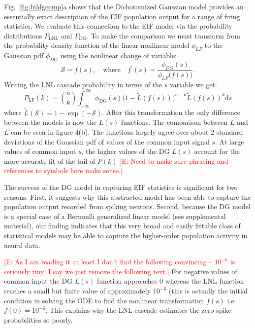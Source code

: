 \documentclass[%
 reprint,
 amsmath,amssymb,
 aps,
floatfix,
]{revtex4-1}
\newcommand{\dd}{\mathrm{d}}
\newcommand{\Ecomment}[1]{\textcolor{red}{[E: #1]}}
\begin{document}
Fig.~\ref{fig:lnldgcomp}a shows that the Dichotomized Gaussian model provides an essentially exact description of the EIF population output for a range of firing statistics.
We evaluate this connection to the EIF model via the probability distributions $P_{\text{LNL}}$ and $P_{\text{DG}}$. To make the comparison we must transform from the probability density function of the linear-nonlinear model $\phi_{LF}$ to the Gaussian pdf $\phi_{DG}$ using the nonlinear change of variable:
\begin{equation}
\mathcal{S} = f(s),\quad\text{where}\quad f^\prime(s) = \frac{\phi_{DG}(s)}{\phi_{LF}\big(f(s)\big)}.
\end{equation}
Writing the LNL cascade probability in terms of the $s$ variable we get:
\begin{equation}
P_{\text{LF}}(k) = \binom{n}{k}\!\!\int_{-\infty}^{~\infty} \phi_{\text{DG}}(s) \big(1-\tilde{L}(f(s))\big)^{n-k} \tilde{L}(f(s))^{k} \dd s
\end{equation}
where $\tilde{L}(\mathcal{S}) = 1-\exp(-\mathcal{S})$. After this transformation the only difference between the models is now the $L(s)$ functions. The comparison between $L$ and $\tilde{L}$ can be seen in figure 4(b). The functions largely agree over about $2$ standard deviations of the Gaussian pdf of values of the common input signal $s$.  At large values of common input $s$, the higher values of the DG $L(s)$ account for the more accurate fit of the tail of $P(k)$ \Ecomment{Need to make sure phrasing and references to symbols here make sense.}  

The success of the DG model in capturing EIF statistics is significant for two reasons.  First, it suggests why this abstracted model has been able to capture the population output recorded from spiking neurons.  Second, because the DG model is a special case of a Bernoulli generalized linear model (see supplemental material), our finding indicates that this very broad and easily fittable class of statistical models may be able to capture the higher-order population activity in neural data.   

\bigskip

\Ecomment{As I am reading it at least I don't find the following convincing -- $10^{-6}$ is seriously tiny!  I say we just remove the following text.} For negative values of common input the DG $L(s)$ function approaches $0$ whereas the LNL function reaches a small but finite value of approximately $10^{-6}$ (this is actually the initial condition in solving the ODE to find the nonlinear transformation $f(s)$ i.e.~$f(0)=10^{-6}$. This explains why the LNL cascade estimates the zero spike probabilities so poorly. \colorbox{BrickRed}{\color{White}{Solving this ODE for $f$ still needs to be checked!}}  
\end{document}
